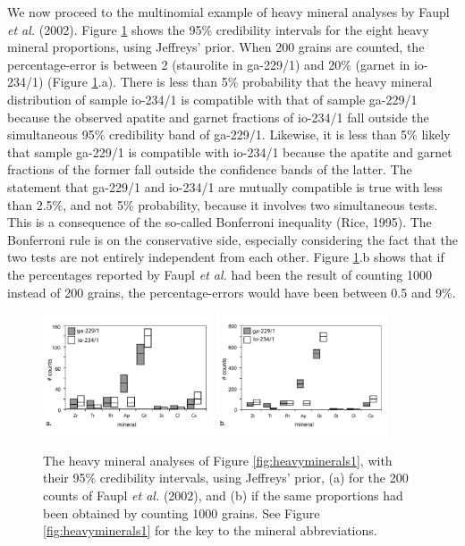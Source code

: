 \documentclass{article}
\begin{document}
We now proceed to the multinomial example of heavy mineral analyses by
Faupl {\it  et al.} (2002). Figure  \ref{fig:heavyminerals2} shows the
95\% credibility  intervals for  the eight heavy  mineral proportions,
using   Jeffreys'   prior.   When   200   grains   are  counted,   the
percentage-error  is  between  2  (staurolite in  ga-229/1)  and  20\%
(garnet  in io-234/1)  (Figure \ref{fig:heavyminerals2}.a).   There is
less  than 5\%  probability  that the  heavy  mineral distribution  of
sample io-234/1 is compatible with that of sample ga-229/1 because the
observed  apatite and garnet  fractions of  io-234/1 fall  outside the
simultaneous 95\%  credibility band of ga-229/1. Likewise,  it is less
than  5\% likely  that  sample ga-229/1  is  compatible with  io-234/1
because the  apatite and garnet  fractions of the former  fall outside
the confidence  bands of the  latter. The statement that  ga-229/1 and
io-234/1 are mutually compatible is true with less than 2.5\%, and not
5\% probability, because it  involves two simultaneous tests.  This is
a  consequence of  the so-called  Bonferroni inequality  (Rice, 1995).
The  Bonferroni   rule  is   on  the  conservative   side,  especially
considering the fact  that the two tests are  not entirely independent
from each other.  Figure  \ref{fig:heavyminerals2}.b shows that if the
percentages reported  by Faupl  {\it et al.}   had been the  result of
counting 1000 instead of  200 grains, the percentage-errors would have
been between 0.5 and 9\%.

\begin{figure}[h]
  \centering
  \includegraphics[width=0.45\textwidth]{heavyMinerals2a.pdf}
  \includegraphics[width=0.45\textwidth]{heavyMinerals2b.pdf}
  \caption{The heavy mineral analyses of Figure \ref{fig:heavyminerals1},
with their 95\% credibility  intervals, using Jeffreys' prior, (a) for
the 200  counts of  Faupl {\it et  al.}  (2002),  and (b) if  the same
proportions  had been obtained  by counting  1000 grains.   See Figure
\ref{fig:heavyminerals1} for the key to the mineral abbreviations.}
  \label{fig:heavyminerals2}
\end{figure}
\end{document}

